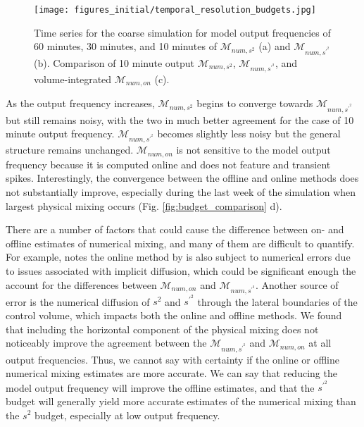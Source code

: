 \documentclass[draft]{agujournal2019}
\begin{document}
\begin{figure}[ht!]
 \centerline{\texttt{[image: figures\_initial/temporal\_resolution\_budgets.jpg]}}
  \caption{Time series for the coarse simulation for model output frequencies of 60 minutes, 30 minutes, and 10 minutes of $\mathcal{M}_{num, s^2}$ (a) and $\mathcal{M}_{num, s^{\prime^2}}$ (b). Comparison of 10 minute output $\mathcal{M}_{num, s^2}$, $\mathcal{M}_{num, s^{\prime^2}}$, and volume-integrated $\mathcal{M}_{num, on}$  (c).}
  \label{fig:mixing_time_series}
\end{figure}

As the output frequency increases, $\mathcal{M}_{num,s^2}$ begins to converge towards $\mathcal{M}_{num,s^{\prime^2}}$ but still remains noisy, with the two in much better agreement for the case of 10 minute output frequency.  $\mathcal{M}_{num,s^{\prime^2}}$ becomes slightly less noisy but the general structure remains unchanged. $\mathcal{M}_{num,on}$ is not sensitive to the model output frequency because it is computed online and does not feature and transient spikes. Interestingly, the convergence between the offline and online methods does not substantially improve, especially during the last week of the simulation when largest physical mixing occurs (Fig. \ref{fig:budget_comparison} d). 

There are a number of factors that could cause the difference between on- and offline estimates of numerical mixing, and many of them are difficult to quantify. For example,  notes the online method by  is also subject to numerical errors due to issues associated with implicit diffusion, which could be significant enough the account for the differences between $\mathcal{M}_{num, on}$ and $\mathcal{M}_{num, s^{\prime^2}}$. Another source of error is the numerical diffusion of $s^2$ and $s^{\prime^2}$ through the lateral boundaries of the control volume, which impacts both the online and offline methods. We found that including the horizontal component of the physical mixing does not noticeably improve the agreement between the $\mathcal{M}_{num,s^{\prime^2}}$ and $\mathcal{M}_{num,on}$ at all output frequencies.  Thus, we cannot say with certainty if the online or offline numerical mixing estimates are more accurate. We can say that reducing the model output frequency will improve the offline estimates, and that the $s^{\prime^2}$ budget will generally yield more accurate estimates of the numerical mixing than the $s^2$ budget, especially at low output frequency. 
\end{document}
